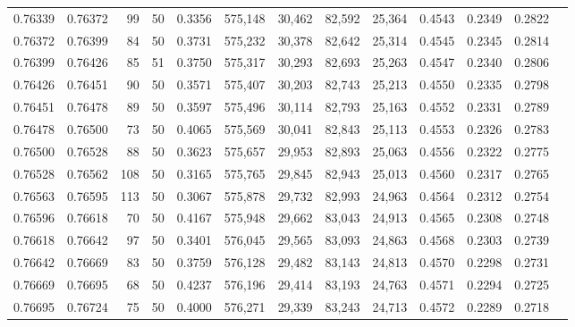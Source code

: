 \begin{tabular}{rrrrrrrrrrrrr}
0.76339 & 0.76372 &    99 &  50 &                                     0.3356 & 575,148 &  30,462 &  82,592 &  25,364 & 0.4543 & 0.2349 & 0.2822 \\
0.76372 & 0.76399 &    84 &  50 &                                     0.3731 & 575,232 &  30,378 &  82,642 &  25,314 & 0.4545 & 0.2345 & 0.2814 \\
0.76399 & 0.76426 &    85 &  51 &                                     0.3750 & 575,317 &  30,293 &  82,693 &  25,263 & 0.4547 & 0.2340 & 0.2806 \\
0.76426 & 0.76451 &    90 &  50 &                                     0.3571 & 575,407 &  30,203 &  82,743 &  25,213 & 0.4550 & 0.2335 & 0.2798 \\
0.76451 & 0.76478 &    89 &  50 &                                     0.3597 & 575,496 &  30,114 &  82,793 &  25,163 & 0.4552 & 0.2331 & 0.2789 \\
0.76478 & 0.76500 &    73 &  50 &                                     0.4065 & 575,569 &  30,041 &  82,843 &  25,113 & 0.4553 & 0.2326 & 0.2783 \\
0.76500 & 0.76528 &    88 &  50 &                                     0.3623 & 575,657 &  29,953 &  82,893 &  25,063 & 0.4556 & 0.2322 & 0.2775 \\
0.76528 & 0.76562 &   108 &  50 &                                     0.3165 & 575,765 &  29,845 &  82,943 &  25,013 & 0.4560 & 0.2317 & 0.2765 \\
0.76563 & 0.76595 &   113 &  50 &                                     0.3067 & 575,878 &  29,732 &  82,993 &  24,963 & 0.4564 & 0.2312 & 0.2754 \\
0.76596 & 0.76618 &    70 &  50 &                                     0.4167 & 575,948 &  29,662 &  83,043 &  24,913 & 0.4565 & 0.2308 & 0.2748 \\
0.76618 & 0.76642 &    97 &  50 &                                     0.3401 & 576,045 &  29,565 &  83,093 &  24,863 & 0.4568 & 0.2303 & 0.2739 \\
0.76642 & 0.76669 &    83 &  50 &                                     0.3759 & 576,128 &  29,482 &  83,143 &  24,813 & 0.4570 & 0.2298 & 0.2731 \\
0.76669 & 0.76695 &    68 &  50 &                                     0.4237 & 576,196 &  29,414 &  83,193 &  24,763 & 0.4571 & 0.2294 & 0.2725 \\
0.76695 & 0.76724 &    75 &  50 &                                     0.4000 & 576,271 &  29,339 &  83,243 &  24,713 & 0.4572 & 0.2289 & 0.2718 \\

\end{tabular}
